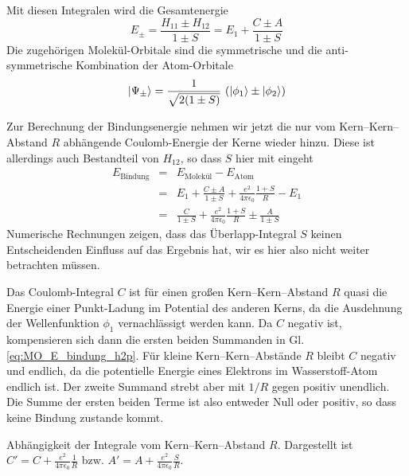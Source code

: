 Mit diesen Integralen wird die Gesamtenergie
\begin{equation}
E_\pm = \frac{H_{11} \pm H_{12}}{1 \pm S} = E_1 + \frac{C \pm A}{1 \pm S}
\end{equation}
Die zugehörigen Molekül-Orbitale sind die symmetrische und die anti-symmetrische Kombination der Atom-Orbitale
\begin{equation}
\ket{\Psi_\pm }= \frac{1}{\sqrt{2 (1 \pm  S)}} \, \left( \ket{\phi_1} \pm \ket{\phi_2} \right)
\end{equation}

Zur Berechnung der Bindungsenergie nehmen wir jetzt die nur vom Kern--Kern--Abstand $R$ abhängende Coulomb-Energie der Kerne wieder hinzu. Diese ist allerdings auch Bestandteil von $H_{12}$, so dass $S$ hier mit eingeht
%
\begin{eqnarray}
 E_\text{Bindung} &=&  E_\text{Molekül} -  E_\text{Atom} \\
  &=&   E_1 + \frac{C \pm A}{1 \pm S} + \frac{e^2}{4 \pi \epsilon_0} \frac{1 + S}{R} - E_1 \\
   &=&\frac{C }{1 \pm S}  + \frac{e^2}{4 \pi \epsilon_0} \frac{1 + S }{R}  \pm \frac{ A}{1 \pm S}    \label{eq:MO_E_bindung_h2p}
\end{eqnarray}
Numerische Rechnungen zeigen, dass das Überlapp-Integral $S$ keinen Entscheidenden Einfluss auf das Ergebnis hat, wir es hier also nicht weiter betrachten müssen.

Das Coulomb-Integral $C$ ist für einen  großen Kern--Kern--Abstand $R$ quasi die Energie einer Punkt-Ladung im Potential des anderen Kerns, da die Ausdehnung der Wellenfunktion $\phi_1$ vernachlässigt werden kann. Da $C$ negativ ist, kompensieren sich dann die ersten beiden Summanden in Gl. \ref{eq:MO_E_bindung_h2p}. Für kleine Kern--Kern--Abstände $R$ bleibt $C$ negativ und endlich, da die potentielle Energie eines Elektrons im Wasserstoff-Atom endlich ist. Der zweite Summand strebt aber mit $1/R$ gegen positiv unendlich. Die Summe der ersten beiden Terme ist also entweder Null oder positiv, so dass keine Bindung zustande kommt.



\begin{marginfigure}

\caption{Abhängigkeit der Integrale vom Kern--Kern--Abstand $R$. Dargestellt ist 
$C' = C  + \frac{e^2}{4 \pi \epsilon_0} \frac{1 }{R}$ bzw. $A' = A   + \frac{e^2}{4 \pi \epsilon_0} \frac{ S }{R}$.
 }
\end{marginfigure}



